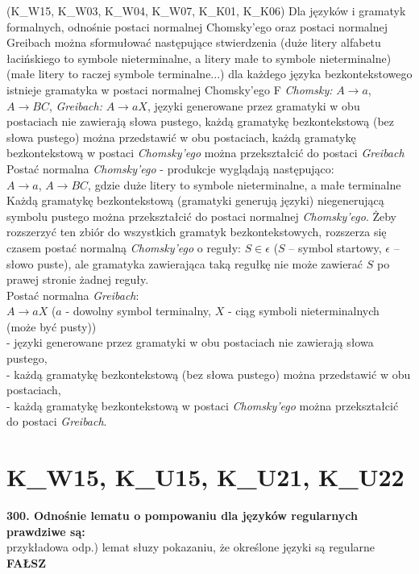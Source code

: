\answer
{(K\_W15, K\_W03, K\_W04, K\_W07, K\_K01, K\_K06) Dla języków i gramatyk formalnych, odnośnie postaci normalnej Chomsky’ego oraz postaci normalnej Greibach można sformułować następujące stwierdzenia (duże litery alfabetu łacińskiego to symbole nieterminalne, a litery małe to symbole nieterminalne)  (małe litery to raczej symbole terminalne...)}
{dla każdego języka bezkontekstowego istnieje gramatyka w postaci normalnej Chomsky’ego}
{F}
{\textit{Chomsky:} $A \to a$, $A \to BC$, \textit{Greibach:} $A \to aX$, języki generowane przez gramatyki w obu postaciach nie zawierają słowa pustego, każdą gramatykę bezkontekstową (bez słowa pustego) można przedstawić w obu postaciach, każdą gramatykę bezkontekstową w postaci \textit{Chomsky'ego} można przekształcić do postaci \textit{Greibach}}
{\\ Postać normalna \textit{Chomsky'ego} - produkcje wyglądają następująco:\\
	$A \to a$, $A \to BC$, gdzie duże litery to symbole nieterminalne, a małe terminalne\\
	\newline
	Każdą gramatykę bezkontekstową (gramatyki generują języki) niegenerującą symbolu pustego można przekształcić do postaci normalnej \textit{Chomsky’ego}. Żeby rozszerzyć ten zbiór do wszystkich gramatyk bezkontekstowych, rozszerza się czasem postać normalną \textit{Chomsky’ego} o reguły: $S \in \epsilon$ ($S$ – symbol startowy, $\epsilon$ – słowo puste), ale gramatyka zawierająca taką regułkę nie może zawierać $S$ po prawej stronie żadnej reguły.\\
	\newline
	Postać normalna \textit{Greibach}:\\
	$A \to aX$ ($a$ - dowolny symbol terminalny, $X$ - ciąg symboli nieterminalnych (może być pusty))\\
	\newline
	- języki generowane przez gramatyki w obu postaciach nie zawierają słowa pustego,\\
	- każdą gramatykę bezkontekstową (bez słowa pustego) można przedstawić w obu postaciach,\\ 
	- każdą gramatykę bezkontekstową w postaci \textit{Chomsky'ego} można przekształcić do postaci \textit{Greibach}.}

\section{K\_W15, K\_U15, K\_U21, K\_U22}
\textbf{300. Odnośnie lematu o pompowaniu dla języków regularnych prawdziwe są:}\\
przykładowa odp.) lemat słuzy pokazaniu, że określone języki są regularne\\
\textbf{FAŁSZ}\\

